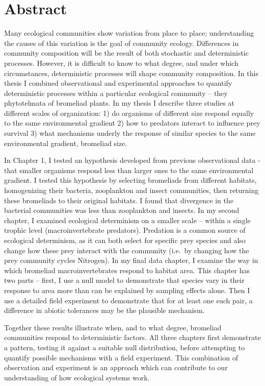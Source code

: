 \chapter*{Abstract}

Many ecological communities show variation from place to place; understanding the causes of this variation is the goal of community ecology. Differences in community composition will be the result of both stochastic and deterministic processes. However, it is difficult to know to what degree, and under which circumstances, deterministic processes will shape community composition. In this thesis I combined observational and experimental approaches to quantify deterministic processes within a particular ecological community -- they phytotelmata of bromeliad plants. In my thesis I describe three studies at different scales of organization: 1) do organisms of different size respond equally to the same environmental gradient 2) how to predators interact to influence prey survival 3) what mechanisms underly the response of similar species to the same environmental gradient, bromeliad size. 

In Chapter 1, I tested an hypothesis developed from previous observational data - that smaller organisms respond less than larger ones to the same environmental gradient. I tested this hypothesis by selecting bromeliads from different habitats, homogenizing their bacteria, zooplankton and insect communities, then returning these bromeliads to their original habitats. I found that divergence in the bacterial communities was less than zooplankton and insects. In my second chapter, I examined ecological determinism on a smaller scale -- within a single trophic level (macroinvertebrate predators). Predation is a common source of ecological determinism, as it can both select for specific prey species and also change how these prey interact with the community (i.e.~by changing how the prey community cycles Nitrogen). In my final data chapter, I examine the way in which bromeliad macroinvertebrates respond to habitat area. This chapter has two parts -- first, I use a null model to demonstrate that species vary in their response to area more than can be explained by sampling effects alone. Then I use a detailed field experiment to demonstrate that for at least one such pair, a difference in abiotic tolerances may be the plausible mechanism. 

Together these results illustrate when, and to what degree, bromeliad communities respond to deterministic factors. All three chapters first demonstrate a pattern, testing it against a suitable null distribution, before attempting to quantify possible mechanisms with a field experiment. This combination of observation and experiment is an approach which can contribute to our understanding of how ecological systems work. 
